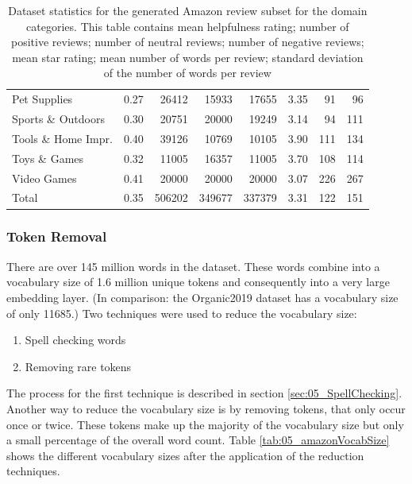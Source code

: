 \begin{table}
\begin{tabularx}{\textwidth}{lXrrrcrr}
		Pet Supplies                &   0.27 &  26412 & 15933 & 17655 &    3.35 &     91 &   96 \\
		Sports \& Outdoors          &   0.30 &  20751 & 20000 & 19249 &    3.14 &     94 &  111 \\
		Tools \& Home Impr.  		&   0.40 &  39126 & 10769 & 10105 &    3.90 &    111 &  134 \\
		Toys \& Games               &   0.32 &  11005 & 16357 & 11005 &    3.70 &    108 &  114 \\
		Video Games                 &   0.41 &   20000 &  	20000 & 20000 &    3.07 &    226 &  267 \\
		\midrule
		Total						&	0.35 & 	   506202 &	349677& 337379&    3.31 &	 122 &  151 \\
		\bottomrule
	\end{tabularx}
	\caption{Dataset statistics for the generated Amazon review subset for the domain categories. This table contains mean helpfulness rating; number of positive reviews; number of neutral reviews; number of negative reviews; mean star rating; mean number of words per review; standard deviation of the number of words per review }
		\label{tab:05_amazonDatasetStats}
\end{table}

\subsubsection*{Token Removal}
There are over 145 million words in the dataset. These words combine into a vocabulary size of 1.6 million unique tokens and consequently into a very large embedding layer. {(In comparison: the Organic2019 dataset has a vocabulary size of only 11685.)} Two techniques were used to reduce the vocabulary size:

\begin{enumerate}
	\item Spell checking words
	\item Removing rare tokens
\end{enumerate}

The process for the first technique is described in section \ref{sec:05_SpellChecking}. Another way to reduce the vocabulary size is by removing tokens, that only occur once or twice. These tokens make up the majority of the vocabulary size but only a small percentage of the overall word count. Table \ref{tab:05_amazonVocabSize} shows the different vocabulary sizes after the application of the reduction techniques.

